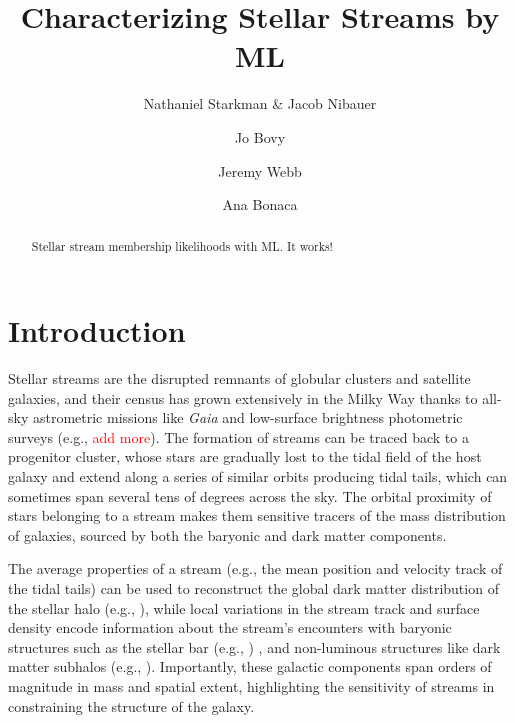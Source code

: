 \documentclass[twocolumn]{aastex631}
\newcommand{\TODO}[1]{{\textcolor{red}{#1}}}
\newcommand{\JN}[1]{\TODO{#1}}
\begin{document}
\title{Characterizing Stellar Streams by ML}

\author{Nathaniel Starkman \& Jacob Nibauer}
\author{Jo Bovy}
\author{Jeremy Webb}
\author{Ana Bonaca}

\begin{abstract}
    Stellar stream membership likelihoods with ML. It works!
\end{abstract}

\section{Introduction} \label{sec:intro}

    Stellar streams are the disrupted remnants of globular clusters and
    satellite galaxies, and their census has grown extensively in the Milky Way
    thanks to all-sky astrometric missions like {\it Gaia} and low-surface
    brightness photometric surveys (e.g., \citealt{2018ApJ...862..114S,
    2021ApJ...914..123I} \JN{add more}).  The formation of streams can be traced back to a
    progenitor cluster, whose stars are gradually lost to the tidal field of the
    host galaxy and extend along a series of similar orbits producing tidal
    tails, which can sometimes span several tens of degrees across the sky. The
    orbital proximity of stars belonging to a stream makes them sensitive
    tracers of the mass distribution of galaxies, sourced by both the baryonic
    and dark matter components.

    The average properties of a stream (e.g., the mean position and velocity
    track of the tidal tails) can be used to reconstruct the global dark matter
    distribution of the stellar halo (e.g., \citealt{1999ApJ...512L.109J, 2014ApJ...795...94B, 2014ApJ...795...95B,2022ApJ...940...22N,2023MNRAS.521.4936K}), while local variations
    in the stream track and surface density encode information about the
    stream's encounters with baryonic structures such as the stellar bar
   (e.g., \citealt{2017MNRAS.470...60E, 2017NatAs...1..633P}) , and non-luminous structures like dark matter subhalos (e.g., \citealt{2017MNRAS.466..628B,2019ApJ...880...38B}). Importantly, these galactic components span orders of magnitude
    in mass and spatial extent, highlighting the sensitivity of streams in
    constraining the structure of the galaxy.
    
\end{document}
